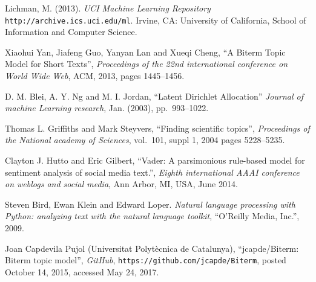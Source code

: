 \documentclass[final]{ieee}
\begin{document}
\begin{thebibliography}{99}
   Lichman, M. (2013). {\it UCI Machine Learning Repository} \texttt{http://archive.ics.uci.edu/ml}. Irvine, CA: University of California, School of Information and Computer Science.

   Xiaohui Yan, Jiafeng Guo, Yanyan Lan and Xueqi Cheng, 
   ``A Biterm Topic Model for Short Texts'', {\it Proceedings of the 22nd international conference on 
   World Wide Web}, ACM, 2013, pages 1445--1456.

   D. M. Blei, A. Y. Ng and M. I. Jordan, ``Latent Dirichlet Allocation'' {\it Journal of machine Learning research},  Jan. (2003), pp.~993--1022.
   
    Thomas L. Griffiths and Mark Steyvers, 
   ``Finding scientific topics'', {\it Proceedings of the National academy of Sciences}, vol.~101, suppl 1, 2004 pages 5228--5235.
   
    Clayton J. Hutto and Eric Gilbert, 
   ``Vader: A parsimonious rule-based model for sentiment analysis of social media text.'', {\it  Eighth international AAAI conference on weblogs and social media}, Ann Arbor, MI, USA, June 2014.
   
    Steven Bird, Ewan Klein and Edward Loper. {\it Natural language processing with Python: analyzing text with the natural language toolkit}, ``O'Reilly Media, Inc.'', 2009.
   
    Joan Capdevila Pujol (Universitat Polyt\`{e}cnica de Catalunya), ``jcapde/Biterm: Biterm topic model'', {\it GitHub}, \texttt{https://github.com/jcapde/Biterm}, posted October 14, 2015, accessed May 24, 2017.


  
    
  
  


\end{thebibliography}
\end{document}
